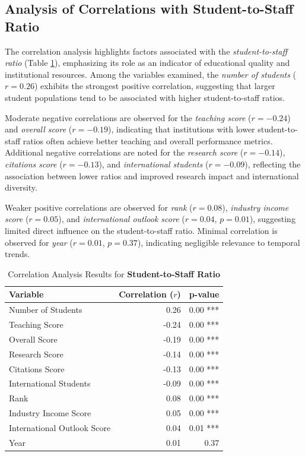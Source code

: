 \documentclass[conference]{IEEEtran}
\begin{document}
\subsection{Analysis of Correlations with Student-to-Staff Ratio}

The correlation analysis highlights factors associated with the \textit{student-to-staff ratio} (Table \ref{tab:correlation_student_staff_ratio}), emphasizing its role as an indicator of educational quality and institutional resources. Among the variables examined, the \textit{number of students} ($r = 0.26$) exhibits the strongest positive correlation, suggesting that larger student populations tend to be associated with higher student-to-staff ratios.

Moderate negative correlations are observed for the \textit{teaching score} ($r = -0.24$) and \textit{overall score} ($r = -0.19$), indicating that institutions with lower student-to-staff ratios often achieve better teaching and overall performance metrics. Additional negative correlations are noted for the \textit{research score} ($r = -0.14$), \textit{citations score} ($r = -0.13$), and \textit{international students} ($r = -0.09$), reflecting the association between lower ratios and improved research impact and international diversity.

Weaker positive correlations are observed for \textit{rank} ($r = 0.08$), \textit{industry income score} ($r = 0.05$), and \textit{international outlook score} ($r = 0.04$, $p = 0.01$), suggesting limited direct influence on the student-to-staff ratio. Minimal correlation is observed for \textit{year} ($r = 0.01$, $p = 0.37$), indicating negligible relevance to temporal trends.

\begin{table}[h!]
	\centering
	\caption{Correlation Analysis Results for \textbf{Student-to-Staff Ratio}}
	\label{tab:correlation_student_staff_ratio}
	\begin{tabular}{|l|r|r|}
		\hline
		\textbf{Variable} & \textbf{Correlation ($r$)} & \textbf{p-value} \\
		\hline
		Number of Students & 0.26 & 0.00 *** \\
		Teaching Score & -0.24 & 0.00 *** \\
		Overall Score & -0.19 & 0.00 *** \\
		Research Score & -0.14 & 0.00 *** \\
		Citations Score & -0.13 & 0.00 *** \\
		International Students & -0.09 & 0.00 *** \\
		Rank & 0.08 & 0.00 *** \\
		Industry Income Score & 0.05 & 0.00 *** \\
		International Outlook Score & 0.04 & 0.01 *** \\
		Year & 0.01 & 0.37 \\
		\hline
	\end{tabular}
\end{table}
\end{document}
